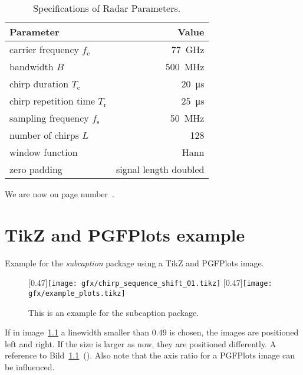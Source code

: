 \begin{table}[!b]
  \centering
  \begin{tabular}{lr}
    Parameter                               & Value\\
    \hline
    carrier frequency $f_{\text{c}}$        & \SI{77}{\giga\hertz}\\
    bandwidth $B$                           & \SI{500}{\mega\hertz}\\
    chirp duration $T_{\text{c}}$           & \SI{20}{\micro\second}\\
    chirp repetition time $T_{\text{r}}$    & \SI{25}{\micro\second}\\
    sampling frequency $f_{\text{s}}$       & \SI{50}{\mega\hertz}\\
    number of chirps $L$                    & 128\\
    window function                         & Hann\\
    zero padding                            & signal length doubled
  \end{tabular}
  \caption{Specifications of Radar Parameters.}
  \label{tab:radar_para}
\end{table}

\clearpage %
\label{ici}
We are now on page number~\pageref{ici}.

\chapter{TikZ and PGFPlots example}
Example for the \emph{subcaption} package using a TikZ and PGFPlots image.

\begin{figure}[tbp]
  \centering
  [0.47\linewidth]{\texttt{[image: gfx/chirp\_sequence\_shift\_01.tikz]}}
  \hfill
  [0.47\linewidth]{\texttt{[image: gfx/example\_plots.tikz]}}
  \caption{This is an example for the subcaption package.}
  \label{fig:subcapex}
\end{figure}

If in image~\ref{fig:subcapex} a linewidth smaller than 0.49 is chosen, the images are positioned
left and right. If the size is larger as now, they are positioned differently. A reference to
Bild~\ref{fig:subcapex}~(). Also note that the axis ratio for a PGFPlots image
can be influenced.

